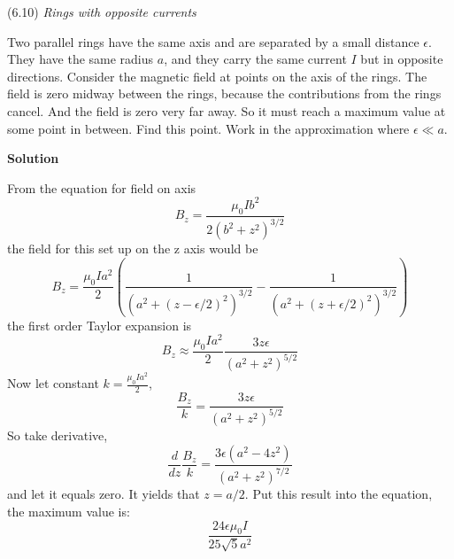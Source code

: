 \documentclass{article}
\begin{document}
\begin{homeworkProblem}
	(6.10) \textit{Rings with opposite currents}

	Two parallel rings have the same axis and are separated by a small distance $\epsilon$. They have the same radius $a$, and they carry the same current $I$ but in opposite directions. Consider the magnetic field at points on the axis of the rings. The field is zero midway between the rings, because the contributions from the rings cancel. And the field is zero very far away. So it must reach a maximum value at some point in between. Find this point. Work in the approximation where $\epsilon\ll a$.

	\textbf{Solution}

	From the equation for field on axis
	\begin{equation}\tag{6.53}
		B_z=\frac{\mu_0Ib^2}{2(b^2+z^2)^{3/2}}
	\end{equation}
	the field for this set up on the z axis would be
	\[
		B_z=\frac{\mu_0Ia^2}{2}\left(\frac{1}{(a^2+(z-\epsilon/2)^2)^{3/2}}-\frac{1}{(a^2+(z+\epsilon/2)^2)^{3/2}}\right)
	\]
	the first order Taylor expansion is
	\[
		B_z\approx\frac{\mu_0Ia^2}{2}\frac{3z\epsilon}{\left(a^2+z^2\right)^{5/2}}
	\]
	Now let constant $k=\frac{\mu_0Ia^2}{2}$,
	\[
		\frac{B_z}{k}=\frac{3z\epsilon}{\left(a^2+z^2\right)^{5/2}}
	\]
	So take derivative,
	\[
		\frac{d}{dz}\frac{B_z}{k}=\frac{3\epsilon\left(a^2-4z^2\right)}{\left(a^2+z^2\right)^{7/2}}
	\]
	and let it equals zero. It yields that $z=a/2$. Put this result into the equation, the maximum value is:
	\[
		\frac{24\epsilon\mu_0I}{25\sqrt{5}a^2}
	\]
\end{homeworkProblem}

\end{document}
